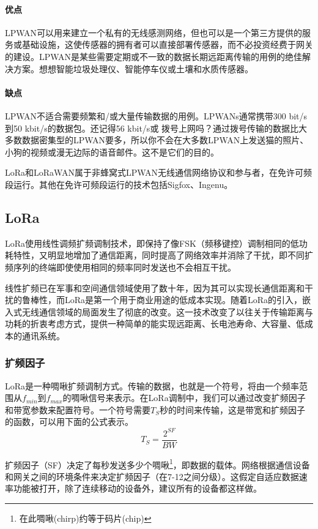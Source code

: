 \documentclass[scheme=chinese,a4paper]{article}
\begin{document}
\paragraph{优点}LPWAN\cite{wiki:LPWAN}可以用来建立一个私有的无线感测网络，但也可以是一个第三方提供的服务或基础设施，这使传感器的拥有者可以直接部署传感器，而不必投资经费于网关的建设。LPWAN是某些需要定期或不一致的数据长期远距离传输的用例的绝佳解决方案。想想智能垃圾处理仪、智能停车仪或土壤和水质传感器。
\paragraph{缺点}LPWAN不适合需要频繁和/或大量传输数据的用例。LPWANs通常携带300 bit/s到50 kbit/s的数据包。还记得56 kbit/s或 拨号上网吗？通过拨号传输的数据比大多数数据密集型的LPWAN要多，所以你不会在大多数LPWAN上发送猫的照片、小狗的视频或漫无边际的语音邮件。这不是它们的目的。

LoRa和LoRaWAN属于非蜂窝式LPWAN无线通信网络协议和参与者，在免许可频段运行。其他在免许可频段运行的技术包括Sigfox、Ingenu。
\subsection{LoRa}
LoRa使用线性调频扩频调制技术，即保持了像FSK（频移键控）调制相同的低功耗特性，又明显地增加了通信距离，同时提高了网络效率并消除了干扰，即不同扩频序列的终端即使使用相同的频率同时发送也不会相互干扰。

线性扩频已在军事和空间通信领域使用了数十年，因为其可以实现长通信距离和干扰的鲁棒性，而LoRa是第一个用于商业用途的低成本实现。随着LoRa的引入，嵌入式无线通信领域的局面发生了彻底的改变。这一技术改变了以往关于传输距离与功耗的折衷考虑方式，提供一种简单的能实现远距离、长电池寿命、大容量、低成本的通讯系统。
\subsubsection{扩频因子}
LoRa是一种啁啾扩频调制方式。传输的数据，也就是一个符号，将由一个频率范围从$f_{min}$到$f_{max}$的啁啾信号来表示。在LoRa调制中，我们可以通过改变扩频因子和带宽参数来配置符号。一个符号需要$T_S$秒的时间来传输，这是带宽和扩频因子的函数，可以用下面的公式表示。
\begin{equation}
  T_S=\frac{2^{SF}}{BW}
\end{equation}

扩频因子（SF）决定了每秒发送多少个啁啾\footnote{在此啁啾(chirp)约等于码片(chip)}，即数据的载体。网络根据通信设备和网关之间的环境条件来决定扩频因子（在7-12之间分级）。这假定自适应数据速率功能被打开，除了连续移动的设备外，建议所有的设备都这样做。
\end{document}
